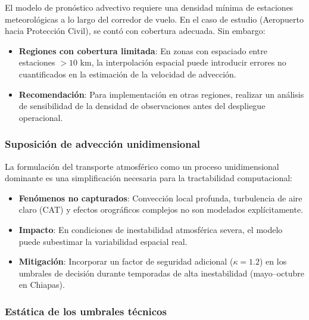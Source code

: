 \documentclass[
  spanish,
  us-letterpaper,
]{scrreprt}
\providecommand{\tightlist}{%
  \setlength{\itemsep}{0pt}\setlength{\parskip}{0pt}}
\numberwithin{equation}{section}
\begin{document}
El modelo de pronóstico advectivo requiere una densidad mínima de
estaciones meteorológicas a lo largo del corredor de vuelo. En el caso
de estudio (Aeropuerto hacia Protección Civil), se contó con cobertura
adecuada. Sin embargo:

\begin{itemize}
\tightlist
\item
  \textbf{Regiones con cobertura limitada}: En zonas con espaciado entre
  estaciones \(> 10\) km, la interpolación espacial puede introducir
  errores no cuantificados en la estimación de la velocidad de
  advección.
\item
  \textbf{Recomendación}: Para implementación en otras regiones,
  realizar un análisis de sensibilidad de la densidad de observaciones
  antes del despliegue operacional.
\end{itemize}

\subsubsection*{Suposición de advección
unidimensional}\label{suposiciuxf3n-de-advecciuxf3n-unidimensional}

La formulación del transporte atmosférico como un proceso unidimensional
dominante es una simplificación necesaria para la tractabilidad
computacional:

\begin{itemize}
\tightlist
\item
  \textbf{Fenómenos no capturados}: Convección local profunda,
  turbulencia de aire claro (CAT) y efectos orográficos complejos no son
  modelados explícitamente.
\item
  \textbf{Impacto}: En condiciones de inestabilidad atmosférica severa,
  el modelo puede subestimar la variabilidad espacial real.
\item
  \textbf{Mitigación}: Incorporar un factor de seguridad adicional
  (\(\kappa = 1.2\)) en los umbrales de decisión durante temporadas de
  alta inestabilidad (mayo--octubre en Chiapas).
\end{itemize}

\subsubsection*{Estática de los umbrales
técnicos}\label{estuxe1tica-de-los-umbrales-tuxe9cnicos}
\end{document}
